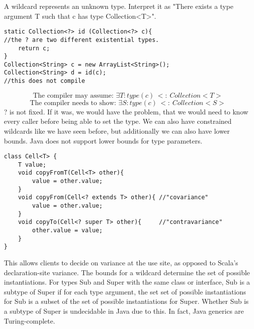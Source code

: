 \begin{mytitle} A wildcard represents an unknown type. Interpret it as "There exists a type argument T such that c has type Collection<T>". 
    \begin{lstlisting}
static Collection<?> id (Collection<?> c){
//the ? are two different existential types.
    return c;
}
Collection<String> c = new ArrayList<String>();
Collection<String> d = id(c);
//this does not compile
    \end{lstlisting}
   $$\text{The compiler may assume: }\exists T: type(c)\ <:\ Collection<T>$$
   $$\text{The compiler needs to show: }\exists S: type(c)\ <:\ Collection<S>$$
   ? is not fixed. If it was, we would have the problem, that we would need to know every caller before being able to set the type. We can also have constrained wildcards like we have seen before, but additionally we can also have lower bounds. Java does not support lower bounds for type parameters.
   \begin{lstlisting}
class Cell<T> {
    T value;
    void copyFromT(Cell<T> other){
        value = other.value;
    }
    void copyFrom(Cell<? extends T> other){ //"covariance"
        value = other.value;
    }
    void copyTo(Cell<? super T> other){     //"contravariance"
        other.value = value;
    }
}
   \end{lstlisting}
   This allows clients to decide on variance at the use site, as opposed to Scala's declaration-site variance. The bounds for a wildcard determine the set of possible instantiations. For types Sub and Super with the same class or interface, Sub is a subtype of Super if for each type argument, the set set of possible instantiations for Sub is a subset of the set of possible instantiations for Super. Whether Sub is a subtype of Super is undecidable in Java due to this. In fact, Java generics are Turing-complete.
\end{mytitle}

